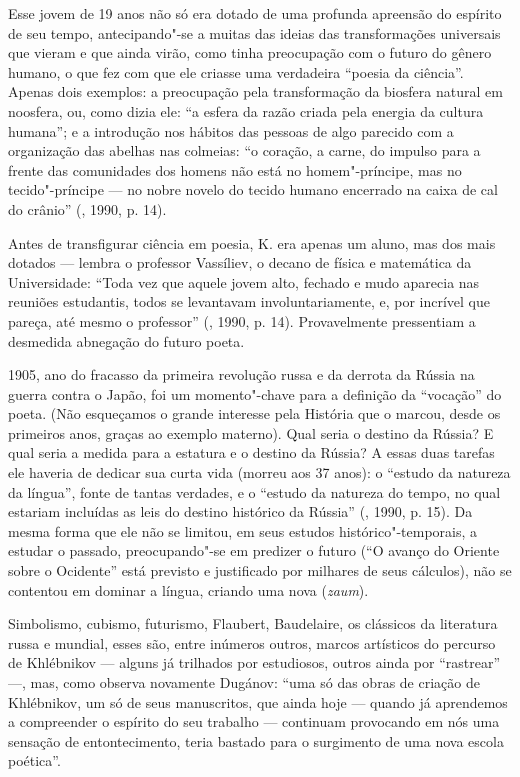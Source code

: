 Esse jovem de 19 anos não só era dotado de uma profunda apreensão do
espírito de seu tempo, antecipando"-se a muitas das ideias das
transformações universais que vieram e que ainda virão, como tinha
preocupação com o futuro do gênero humano, o que fez com que ele criasse
uma verdadeira ``poesia da ciência''. Apenas dois exemplos: a
preocupação pela transformação da biosfera natural em noosfera, ou, como
dizia ele: ``a esfera da razão criada pela energia da cultura humana'';
e a introdução nos hábitos das pessoas de algo parecido com a
organização das abelhas nas colmeias: ``o coração, a carne, do impulso
para a frente das comunidades dos homens não está no homem"-príncipe, mas
no tecido"-príncipe --- no nobre novelo do tecido humano encerrado na
caixa de cal do crânio'' (, 1990, p. 14).

Antes de transfigurar ciência em poesia, K.
era apenas um aluno, mas dos mais dotados --- lembra o professor Vassíliev, o
decano de física e matemática da Universidade: ``Toda vez que aquele
jovem alto, fechado e mudo aparecia nas reuniões estudantis, todos se
levantavam involuntariamente, e, por incrível que pareça, até mesmo o
professor'' (, 1990, p. 14). Provavelmente pressentiam a desmedida abnegação do futuro
poeta.

1905, ano do fracasso da primeira revolução
russa e da derrota da Rússia na guerra contra o Japão, foi um momento"-chave
para a definição da ``vocação'' do poeta. (Não esqueçamos o
grande interesse pela História que o marcou, desde os primeiros
anos, graças ao exemplo materno). Qual seria o destino da Rússia? E qual
seria a medida para a estatura e o destino da Rússia? A essas duas
tarefas ele haveria de dedicar sua curta vida (morreu aos
37 anos): o ``estudo da natureza da língua'', fonte de tantas verdades, e o
``estudo da natureza do tempo, no qual estariam incluídas as leis do
destino histórico da Rússia'' (, 1990, p. 15). Da mesma forma que ele não se limitou, em
seus estudos histórico"-temporais, a estudar o passado, preocupando"-se
em predizer o futuro (``O avanço do Oriente sobre o Ocidente'' está
previsto e justificado por milhares de seus cálculos), não se contentou em dominar a língua,
criando uma nova (\emph{zaum}).

Simbolismo, cubismo, futurismo, Flaubert, Baudelaire, os clássicos da
literatura russa e mundial, esses são, entre inúmeros outros, marcos
artísticos do percurso de Khlébnikov --- alguns já trilhados por estudiosos,
outros ainda por ``rastrear'' ---, mas, como observa novamente Dugánov: ``uma só das
obras de criação de Khlébnikov, um só de seus manuscritos, que ainda hoje
--- quando já aprendemos a compreender o espírito do seu trabalho ---
continuam provocando em nós uma sensação de entontecimento, teria
bastado para o surgimento de uma nova escola poética''.

